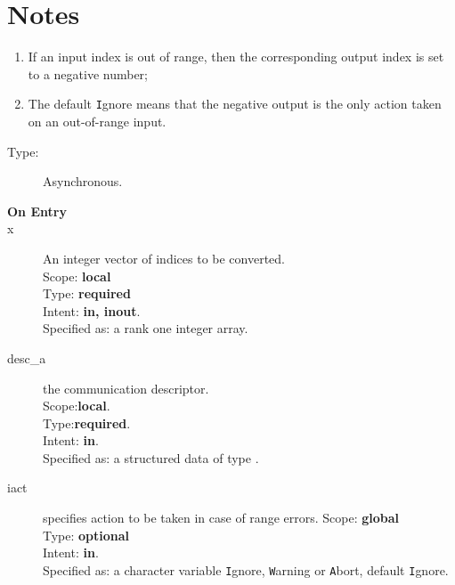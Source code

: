 \section*{Notes}
\begin{enumerate}
\item If an input index is out of range, then the corresponding output
  index is set to a negative number;
\item The default \verb|I|gnore means that the negative output is the
  only action taken on an out-of-range input.
\end{enumerate}


%
%


\begin{description}
\item[Type:] Asynchronous.
\item[\bf On Entry]
\item[x] An integer vector of indices to be converted.\\
Scope: {\bf local} \\
Type: {\bf required}\\
Intent: {\bf in, inout}.\\
Specified as: a rank one integer array.\\
\item[desc\_a] the communication descriptor.\\
Scope:{\bf local}.\\
Type:{\bf required}.\\
Intent: {\bf in}.\\
Specified as: a structured data of type \descdata.
\item[iact] specifies action to be taken in case of range errors. 
Scope: {\bf global} \\
Type: {\bf optional}\\
Intent: {\bf in}.\\
Specified as: a character variable  \verb|I|gnore, \verb|W|arning or
\verb|A|bort, default \verb|I|gnore.
\end{description}

